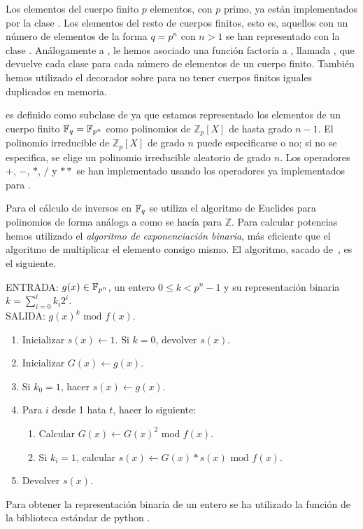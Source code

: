Los elementos del cuerpo finito $p$ elementos, con $p$ primo, ya están implementados por la clase . Los elementos del resto de cuerpos finitos, esto es, aquellos con un número de elementos de la forma $q = p^n$ con $n > 1$ se han representado con la clase . Análogamente a , le hemos asociado una función factoría a , llamada , que devuelve cada clase para cada número de elementos de un cuerpo finito. También hemos utilizado el decorador  sobre  para no tener cuerpos finitos iguales duplicados en memoria.

 es definido como subclase de  ya que estamos representado los elementos de un cuerpo finito $\mathbb{F}_q = \mathbb{F}_{p^n}$ como polinomios de $\mathbb{Z}_p[X]$ de hasta grado $n-1$. El polinomio irreducible de $\mathbb{Z}_p[X]$ de grado $n$ puede especificarse o no; si no se especifica, se elige un polinomio irreducible aleatorio de grado $n$. Los operadores  $+$, $-$, $*$, $/$ y $**$ se han implementado usando los operadores ya implementados para .

Para el cálculo de inversos en $\mathbb{F}_q$ se utiliza el algoritmo de Euclides para polinomios de forma análoga a como se hacía para $\mathbb{Z}$. Para calcular potencias hemos utilizado el \emph{algoritmo de exponenciación binaria}, más eficiente que el algoritmo de multiplicar el elemento consigo mismo. El algoritmo, sacado de~\cite{Menezes:1996}, es el siguiente.
\begin{algoritmo2}
ENTRADA: $g(x) \in \mathbb{F}_{p^n}$, un entero $0 \le k < p^n - 1$ y su representación binaria $k = \sum_{i=0}^{t} k_i 2^i$. \\
SALIDA: $g(x)^k \textrm{ mod } f(x)$.
\begin{enumerate}
    \item Inicializar $s(x) \leftarrow 1$. Si $k = 0$, devolver $s(x)$.
    \item Inicializar $G(x) \leftarrow  g(x)$.
    \item Si $k_0 = 1$, hacer $s(x) \leftarrow  g(x)$.
    \item Para $i$ desde 1 hata $t$, hacer lo siguiente:
    \begin{enumerate}
        \item Calcular $G(x) \leftarrow  G(x)^2 \textrm{ mod } f(x)$.
        \item Si $k_i = 1$, calcular $s(x) \leftarrow G(x) * s(x) \textrm{ mod } f(x)$.
    \end{enumerate}
    \item Devolver $s(x)$.
\end{enumerate}
\end{algoritmo2}
Para obtener la representación binaria de un entero se ha utilizado la función de la biblioteca estándar de python .


